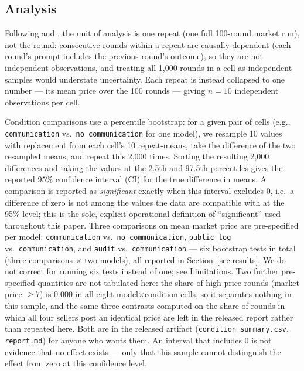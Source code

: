 \documentclass[11pt]{article}
\begin{document}
\subsection{Analysis}
\label{sec:analysis}

Following \citet{calvano2020} and \citet{fish2024}, the unit of analysis is one repeat (one full 100-round market run), not the round: consecutive rounds within a repeat are causally dependent (each round's prompt includes the previous round's outcome), so they are not independent observations, and treating all 1{,}000 rounds in a cell as independent samples would understate uncertainty. Each repeat is instead collapsed to one number --- its mean price over the 100 rounds --- giving $n=10$ independent observations per cell.

Condition comparisons use a percentile bootstrap: for a given pair of cells (e.g., \texttt{communication} vs.\ \texttt{no\_communication} for one model), we resample 10 values with replacement from each cell's 10 repeat-means, take the difference of the two resampled means, and repeat this 2{,}000 times. Sorting the resulting 2{,}000 differences and taking the values at the 2.5th and 97.5th percentiles gives the reported 95\% confidence interval (CI) for the true difference in means. A comparison is reported as \emph{significant} exactly when this interval excludes 0, i.e.\ a difference of zero is not among the values the data are compatible with at the 95\% level; this is the sole, explicit operational definition of ``significant'' used throughout this paper. Three comparisons on mean market price are pre-specified per model: \texttt{communication} vs.\ \texttt{no\_communication}, \texttt{public\_log} vs.\ \texttt{communication}, and \texttt{audit} vs.\ \texttt{communication} --- six bootstrap tests in total (three comparisons $\times$ two models), all reported in Section~\ref{sec:results}. We do not correct for running six tests instead of one; see Limitations. Two further pre-specified quantities are not tabulated here: the share of high-price rounds (market price $\geq 7$) is 0.000 in all eight model$\times$condition cells, so it separates nothing in this sample, and the same three contrasts computed on the share of rounds in which all four sellers post an identical price are left in the released report rather than repeated here. Both are in the released artifact (\texttt{condition\_summary.csv}, \texttt{report.md}) for anyone who wants them. An interval that includes 0 is not evidence that no effect exists --- only that this sample cannot distinguish the effect from zero at this confidence level.
\end{document}
